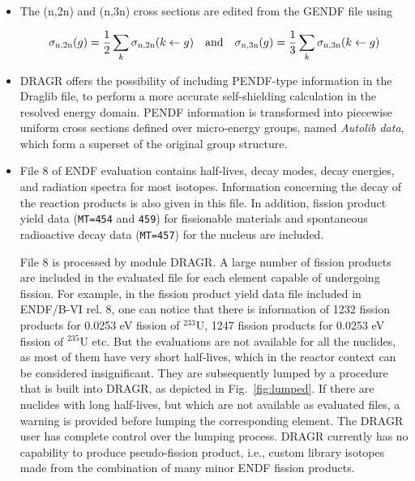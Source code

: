 \begin{itemize}
\item The (n,2n) and (n,3n) cross sections are edited from the GENDF file using

\begin{equation}
\sigma_{\rm n,2n}(g)={1 \over 2}\sum_k \sigma_{\rm n,2n}(k \leftarrow g) \
\ \ {\rm and} \ \ \  \sigma_{\rm n,3n}(g)={1 \over 3}\sum_k
\sigma_{\rm n,3n}(k \leftarrow g)
\end{equation}

\item DRAGR offers the possibility of including PENDF-type information in the
Draglib file, to perform a more accurate self-shielding calculation in the
resolved energy domain. PENDF information is transformed into piecewise uniform
cross sections defined over micro-energy groups, named {\sl Autolib data},
which form a superset of the original group structure.

\item File 8 of ENDF evaluation contains half-lives, decay modes, decay
energies, and radiation spectra for most isotopes. Information concerning
the decay of the reaction products is also given in this file. In addition,
fission product yield data ({\tt MT=454} and {\tt 459}) for fissionable
materials and spontaneous radioactive decay data ({\tt MT=457}) for the
nucleus are included.

\vskip 0.08cm

File 8 is processed by module DRAGR. A large number of fission products are
included in
the evaluated file for each element capable of undergoing fission. For example,
in the fission product
yield data file included in ENDF/B-VI rel. 8, one can notice that there is
information of 1232 fission
products for 0.0253 eV fission of $^{233}$U, 1247 fission products for 0.0253
eV fission of $^{235}$U etc. But the
evaluations are not available for all the nuclides, as most of them have very
short half-lives, which in the
reactor context can be considered insignificant. They are subsequently lumped
by a procedure that is
built into DRAGR, as depicted in Fig.~\ref{fig:lumped}. If there are nuclides
with long half-lives, but which are not available as evaluated files, a warning
is provided before lumping the corresponding element. The DRAGR user has
complete control over the lumping process. DRAGR currently has no capability
to produce pseudo-fission product, i.e., custom library isotopes made from
the combination of many minor ENDF fission products.

\vskip 0.08cm


\end{itemize}

